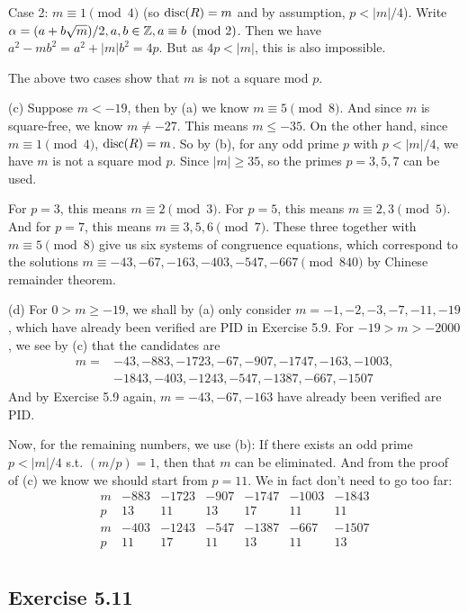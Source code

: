 \documentclass[../Marcus.tex]{subfiles}
\begin{document}
Case 2: $m\equiv1 \pmod{4}$ (so $\operatorname{disc}(R)=m$ and by assumption, $p<|m|/4$). Write $\alpha = (a+b\sqrt{m})/2,a,b\in\mathbb{Z},a \equiv b \pmod{2}$. Then we have $a^2 - mb^2 = a^2 + |m|b^2 = 4p$. But as $4p<|m|$, this is also impossible.

The above two cases show that $m$ is not a square mod $p$.

(c) Suppose $m<-19$, then by (a) we know $m\equiv5 \pmod{8}$. And since $m$ is square-free, we know $m\neq-27$. This means $m\leq-35$. On the other hand, since $m\equiv1 \pmod{4}$, $\operatorname{disc}(R)=m$. So by (b), for any odd prime $p$ with $p<|m|/4$, we have $m$ is not a square mod $p$. Since $|m|\geq35$, so the primes $p=3,5,7$ can be used.

For $p=3$, this means $m \equiv 2 \pmod{3}$. For $p=5$, this means $m \equiv 2,3 \pmod{5}$. And for $p=7$, this means $m \equiv 3,5,6 \pmod{7}$. These three together with $m\equiv5 \pmod{8}$ give us six systems of congruence equations, which correspond to the solutions $m\equiv -43,-67,-163,-403,-547,-667 \pmod{840}$ by Chinese remainder theorem.

(d) For $0>m\geq-19$, we shall by (a) only consider $m=-1,-2,-3,-7,-11,-19$, which have already been verified are PID in Exercise 5.9. For $-19 > m > -2000$, we see by (c) that the candidates are
\begin{align*}
m = &-43,-883,-1723,-67,-907,-1747,-163,-1003,\\
&-1843,-403,-1243,-547,-1387,-667,-1507
\end{align*}
And by Exercise 5.9 again, $m=-43,-67,-163$ have already been verified are PID.

Now, for the remaining numbers, we use (b): If there exists an odd prime $p<|m|/4$ s.t. $(m/p) = 1$, then that $m$ can be eliminated. And from the proof of (c) we know we should start from $p=11$. We in fact don't need to go too far:
$$
\begin{array}{c|c|c|c|c|c|c}
m&-883&-1723&-907&-1747&-1003&-1843      \\
\hline
p&13&11&13&17&11&11   \\
\hline
m&-403&-1243&-547&-1387&-667&-1507     \\
\hline
p&11&17&11&13&11&13\\
\end{array}
$$

\subsection*{Exercise 5.11}
\end{document}
